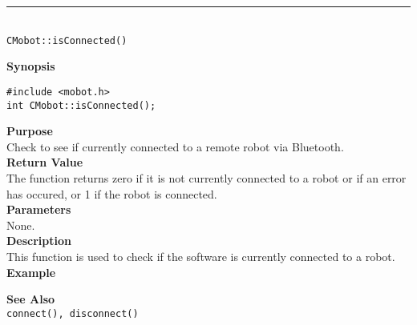 \noindent
\vspace{5pt}
\rule{4.5in}{0.015in}\\
\noindent
{\LARGE \texttt{CMobot::isConnected()}}\\
{}

\noindent
{\bf Synopsis}
\vspace{-8pt}
\begin{verbatim}
#include <mobot.h>
int CMobot::isConnected();
\end{verbatim}

\noindent
{\bf Purpose}\\
Check to see if currently connected to a remote robot via Bluetooth.\\

\noindent
{\bf Return Value}\\
The function returns zero if it is not currently connected to a robot or if an 
error has occured, or 1 if the robot is connected.\\

\noindent
{\bf Parameters}\\
None.\\

\noindent
{\bf Description}\\
This function is used to check if the software is currently connected to
a robot.\\

\noindent
{\bf Example}\\
\noindent

\noindent
{\bf See Also}\\
\texttt{connect(), disconnect()}\\
